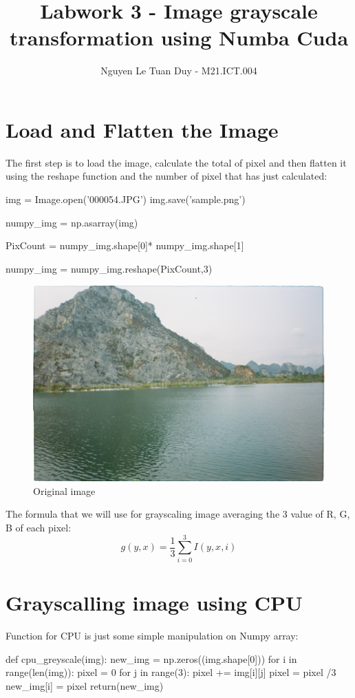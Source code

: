 \documentclass{article}
\title{Labwork 3 - Image grayscale transformation using Numba Cuda}
\author{Nguyen Le Tuan Duy - M21.ICT.004}
\date{}
\begin{document}
\maketitle
\section{Load and Flatten the Image}
The first step is to load the image, calculate the total of pixel and then flatten it using the reshape function and the number of pixel that has just calculated:

\begin{python}
img = Image.open('000054.JPG')
img.save('sample.png')
 
numpy_img = np.asarray(img)

PixCount = numpy_img.shape[0]* numpy_img.shape[1]


numpy_img = numpy_img.reshape(PixCount,3)
\end{python}

\begin{figure}
    \begin{center}
        \includegraphics[scale=0.08]{000054.JPG}
        \caption{Original image}
    \end{center}
\end{figure}

The formula that we will use for grayscaling image averaging the 3 value of R, G, B of each pixel:
\begin{equation}
    g(y,x) = \frac{1}{3}\sum_{i=0}^{3}I(y,x,i)
\end{equation}

\section{Grayscalling image using CPU}
Function for CPU is just some simple manipulation on Numpy array:
\begin{python}
def cpu_greyscale(img):
  new_img = np.zeros((img.shape[0]))
  for i in range(len(img)):
    pixel = 0
    for j in range(3):
      pixel += img[i][j]
    pixel = pixel /3
    new_img[i] = pixel
  return(new_img)
\end{python}
\end{document}
